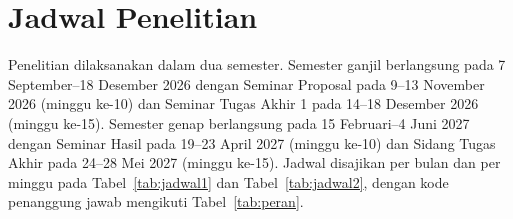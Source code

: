 \section{Jadwal Penelitian}
\label{sec:jadwal}

Penelitian dilaksanakan dalam dua semester. Semester ganjil berlangsung pada 7 September--18 Desember 2026 dengan Seminar Proposal pada 9--13 November 2026 (minggu ke-10) dan Seminar Tugas Akhir 1 pada 14--18 Desember 2026 (minggu ke-15). Semester genap berlangsung pada 15 Februari--4 Juni 2027 dengan Seminar Hasil pada 19--23 April 2027 (minggu ke-10) dan Sidang Tugas Akhir pada 24--28 Mei 2027 (minggu ke-15). Jadwal disajikan per bulan dan per minggu pada Tabel~\ref{tab:jadwal1} dan Tabel~\ref{tab:jadwal2}, dengan kode penanggung jawab mengikuti Tabel~\ref{tab:peran}.

